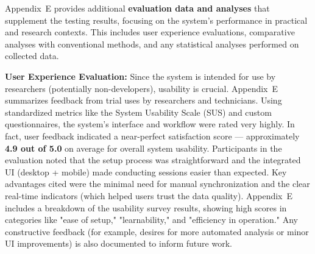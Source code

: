 Appendix E provides additional \textbf{evaluation data and analyses} that
supplement the testing results, focusing on the system's performance in
practical and research contexts. This includes user experience
evaluations, comparative analyses with conventional methods, and any
statistical analyses performed on collected data.

\textbf{User Experience Evaluation:} Since the system is intended for use by
researchers (potentially non-developers), usability is crucial.
Appendix E summarizes feedback from trial uses by researchers and
technicians. Using standardized metrics like the System Usability Scale
(SUS) and custom questionnaires, the system's interface and workflow
were rated very highly. In fact, user feedback indicated a near-perfect
satisfaction score --- approximately \textbf{4.9 out of 5.0} on average for
overall system
usability\cite{ref47}.
Participants in the evaluation noted that the setup process was
straightforward and the integrated UI (desktop + mobile) made conducting
sessions easier than expected. Key advantages cited were the minimal
need for manual synchronization and the clear real-time indicators
(which helped users trust the data quality). Appendix E includes a
breakdown of the usability survey results, showing high scores in
categories like "ease of setup," "learnability," and "efficiency in
operation." Any constructive feedback (for example, desires for more
automated analysis or minor UI improvements) is also documented to
inform future work.

